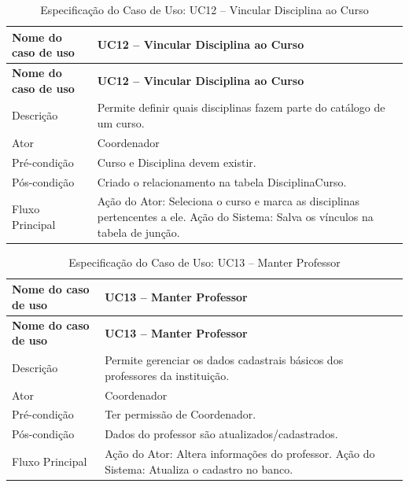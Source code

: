 \fonteautores

\vspace{\baselineskip}

\Needspace{0.48\textheight}
\begin{longtable}{|L{4.5cm}|L{10.5cm}|}
\caption{Especificação do Caso de Uso: UC12 -- Vincular Disciplina ao Curso} \\
\hline
\textbf{Nome do caso de uso} & \textbf{UC12 -- Vincular Disciplina ao Curso} \\
\hline
\endfirsthead
\hline
\textbf{Nome do caso de uso} & \textbf{UC12 -- Vincular Disciplina ao Curso} \\
\hline
\endhead
Descrição       & Permite definir quais disciplinas fazem parte do catálogo de um curso. \\
\hline
Ator            & Coordenador \\
\hline
Pré-condição    & Curso e Disciplina devem existir. \\
\hline
Pós-condição    & Criado o relacionamento na tabela DisciplinaCurso. \\
\hline
Fluxo Principal & Ação do Ator: Seleciona o curso e marca as disciplinas pertencentes a ele. Ação do Sistema: Salva os vínculos na tabela de junção. \\
\hline
\end{longtable}

\fonteautores

\vspace{\baselineskip}

\Needspace{0.48\textheight}
\begin{longtable}{|L{4.5cm}|L{10.5cm}|}
\caption{Especificação do Caso de Uso: UC13 -- Manter Professor} \\
\hline
\textbf{Nome do caso de uso} & \textbf{UC13 -- Manter Professor} \\
\hline
\endfirsthead
\hline
\textbf{Nome do caso de uso} & \textbf{UC13 -- Manter Professor} \\
\hline
\endhead
Descrição       & Permite gerenciar os dados cadastrais básicos dos professores da instituição. \\
\hline
Ator            & Coordenador \\
\hline
Pré-condição    & Ter permissão de Coordenador. \\
\hline
Pós-condição    & Dados do professor são atualizados/cadastrados. \\
\hline
Fluxo Principal & Ação do Ator: Altera informações do professor. Ação do Sistema: Atualiza o cadastro no banco. \\
\hline
\end{longtable}

